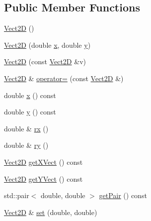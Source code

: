 \subsection*{Public Member Functions}
\begin{DoxyCompactItemize}
\item 
\hyperlink{classVect2D_a6c93f0ad4edc535515d33f8e8f6b7842_a6c93f0ad4edc535515d33f8e8f6b7842}{Vect2D} ()
\item 
\hyperlink{classVect2D_ac977f3d217a9ad80f39fcf28a7b217f3_ac977f3d217a9ad80f39fcf28a7b217f3}{Vect2D} (double \hyperlink{classVect2D_a5ec56ffcb57f5dc61cb24a8672bfa196_a5ec56ffcb57f5dc61cb24a8672bfa196}{x}, double \hyperlink{classVect2D_ad0ca2a82c313cfa471e0339bafc635e9_ad0ca2a82c313cfa471e0339bafc635e9}{y})
\item 
\hyperlink{classVect2D_a2875ad36fed58a50922cda20f0e42afc_a2875ad36fed58a50922cda20f0e42afc}{Vect2D} (const \hyperlink{classVect2D}{Vect2D} \&v)
\item 
\hyperlink{classVect2D}{Vect2D} \& \hyperlink{classVect2D_ac64ef2415eabdf79c587c71a2f727701_ac64ef2415eabdf79c587c71a2f727701}{operator=} (const \hyperlink{classVect2D}{Vect2D} \&)
\item 
double \hyperlink{classVect2D_a5ec56ffcb57f5dc61cb24a8672bfa196_a5ec56ffcb57f5dc61cb24a8672bfa196}{x} () const
\item 
double \hyperlink{classVect2D_ad0ca2a82c313cfa471e0339bafc635e9_ad0ca2a82c313cfa471e0339bafc635e9}{y} () const
\item 
double \& \hyperlink{classVect2D_a157a80045188c626d2a582aa5b42ea09_a157a80045188c626d2a582aa5b42ea09}{rx} ()
\item 
double \& \hyperlink{classVect2D_ab29c733af56363e7b640d53114fdb797_ab29c733af56363e7b640d53114fdb797}{ry} ()
\item 
\hyperlink{classVect2D}{Vect2D} \hyperlink{classVect2D_a1bf72f44ebf9444c5f52a6499dc8dcb3_a1bf72f44ebf9444c5f52a6499dc8dcb3}{get\+X\+Vect} () const
\item 
\hyperlink{classVect2D}{Vect2D} \hyperlink{classVect2D_a13e0a84562e7b1ebef4a530aaacfa060_a13e0a84562e7b1ebef4a530aaacfa060}{get\+Y\+Vect} () const
\item 
std\+::pair$<$ double, double $>$ \hyperlink{classVect2D_a347f48c0f8fb2f05592251f78be33a5c_a347f48c0f8fb2f05592251f78be33a5c}{get\+Pair} () const
\item 
\hyperlink{classVect2D}{Vect2D} \& \hyperlink{classVect2D_a0dd170984a57bb034ccf4f939bedf117_a0dd170984a57bb034ccf4f939bedf117}{set} (double, double)
\item 

\end{DoxyCompactItemize}
